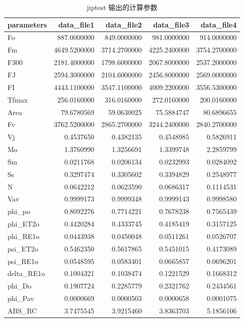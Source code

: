 \documentclass[]{krantz}
\theoremstyle{definition}
\theoremstyle{definition}
\theoremstyle{definition}
\theoremstyle{remark}
\begin{document}
\begin{longtable}{lrrrr}
\caption{\label{tab:jipres}jiptest 输出的计算参数}\\
\toprule
parameters & data\_file1 & data\_file2 & data\_file3 & data\_file4\\
\midrule
Fo & 887.0000000 & 849.0000000 & 981.0000000 & 914.0000000\\
Fm & 4649.5200000 & 3714.2700000 & 4225.2400000 & 3754.2700000\\
F300 & 2181.4000000 & 1798.6000000 & 2067.8000000 & 2537.2000000\\
FJ & 2594.3000000 & 2104.6000000 & 2456.8000000 & 2569.0000000\\
FI & 4443.1100000 & 3547.1100000 & 4009.2200000 & 3556.5300000\\
\addlinespace
Tfmax & 256.0160000 & 316.0160000 & 272.0160000 & 200.0160000\\
Area & 79.6780569 & 59.0630025 & 75.5884747 & 80.6896655\\
Fv & 3762.5200000 & 2865.2700000 & 3244.2400000 & 2840.2700000\\
Vj & 0.4537650 & 0.4382135 & 0.4548985 & 0.5826911\\
Mo & 1.3760990 & 1.3256691 & 1.3399748 & 2.2859799\\
\addlinespace
Sm & 0.0211768 & 0.0206134 & 0.0232993 & 0.0284092\\
Ss & 0.3297474 & 0.3305602 & 0.3394829 & 0.2548977\\
N & 0.0642212 & 0.0623590 & 0.0686317 & 0.1114531\\
Vav & 0.9999173 & 0.9999348 & 0.9999143 & 0.9998580\\
phi\_po & 0.8092276 & 0.7714221 & 0.7678238 & 0.7565439\\
\addlinespace
phi\_ET2o & 0.4420284 & 0.4333745 & 0.4185419 & 0.3157125\\
phi\_RE1o & 0.0443938 & 0.0450048 & 0.0511261 & 0.0526707\\
psi\_ET2o & 0.5462350 & 0.5617865 & 0.5451015 & 0.4173089\\
psi\_RE1o & 0.0548595 & 0.0583401 & 0.0665857 & 0.0696201\\
delta\_RE1o & 0.1004321 & 0.1038474 & 0.1221529 & 0.1668312\\
\addlinespace
phi\_Do & 0.1907724 & 0.2285779 & 0.2321762 & 0.2434561\\
phi\_Pav & 0.0000669 & 0.0000503 & 0.0000658 & 0.0001075\\
ABS\_RC & 3.7475545 & 3.9215460 & 3.8363703 & 5.1856106\\

\end{longtable}
\end{document}
